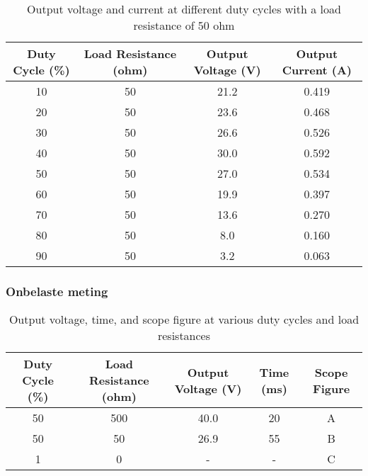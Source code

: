 \begin{table}[h!]
\centering
\begin{tabular}{|c|c|c|c|}
\hline
\textbf{Duty Cycle (\%)} & \textbf{Load Resistance (ohm)} & \textbf{Output Voltage (V)} & \textbf{Output Current (A)} \\ \hline
10 & 50 & 21.2 & 0.419 \\ \hline
20 & 50 & 23.6 & 0.468 \\ \hline
30 & 50 & 26.6 & 0.526 \\ \hline
40 & 50 & 30.0 & 0.592 \\ \hline
50 & 50 & 27.0 & 0.534 \\ \hline
60 & 50 & 19.9 & 0.397 \\ \hline
70 & 50 & 13.6 & 0.270 \\ \hline
80 & 50 & 8.0 & 0.160 \\ \hline
90 & 50 & 3.2 & 0.063 \\ \hline
\end{tabular}
\caption{Output voltage and current at different duty cycles with a load resistance of 50 ohm}
\label{tab:duty_cycle_output_50ohm}
\end{table}
\subsubsection{Onbelaste meting}
\begin{table}[h!]
\centering
\begin{tabular}{|c|c|c|c|c|}
\hline
\textbf{Duty Cycle (\%)} & \textbf{Load Resistance (ohm)} & \textbf{Output Voltage (V)} & \textbf{Time (ms)} & \textbf{Scope Figure} \\ \hline
50 & 500 & 40.0 & 20 & A \\ \hline
50 & 50 & 26.9 & 55 & B \\ \hline
1 & 0 & - & - & C \\ \hline
\end{tabular}
\caption{Output voltage, time, and scope figure at various duty cycles and load resistances}
\label{tab:duty_cycle_scope}
\end{table}

